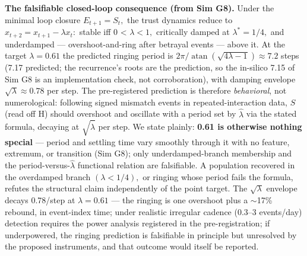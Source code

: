 \documentclass[
]{article}
\begin{document}
\textbf{The falsifiable closed-loop consequence (from Sim G8).} Under
the minimal loop closure \(E_{t+1} = S_t,\) the trust dynamics reduce to
\(x_{t+2} = x_{t+1} - \lambda x_t:\) stable iff 0 \textless{}
\(\lambda < 1,\) critically damped at \(\lambda^{*} = 1/4,\) and
underdamped --- overshoot-and-ring after betrayal events --- above it.
At the target \(\lambda = 0.61\) the predicted ringing period is
\(2\pi/\mathop{\mathrm{atan}}(\sqrt{4\lambda-1}) \approx 7.2\) steps
(7.17 predicted; the recurrence's roots are the prediction, so the
in-silico 7.15 of Sim G8 is an implementation check, not corroboration),
with damping envelope \(\sqrt{\lambda} \approx 0.78\) per step. The
pre-registered prediction is therefore \emph{behavioral}, not
numerological: following signed mismatch events in repeated-interaction
data, \(S\) (read off H) should overshoot and oscillate with a period
set by \(\hat{\lambda}\) via the stated formula, decaying at
\(\sqrt{\hat{\lambda}}\) per step. We state plainly: \textbf{0.61 is
otherwise nothing special} --- period and settling time vary smoothly
through it with no feature, extremum, or transition (Sim G8); only
underdamped-branch membership and the period-versus-\(\hat{\lambda}\)
functional relation are falsifiable. A population recovered in the
overdamped branch \((\lambda < 1/4),\) or ringing whose period fails the
formula, refutes the structural claim independently of the point target.
The \(\sqrt{\lambda}\) envelope decays 0.78/step at \(\lambda = 0.61\)
--- the ringing is one overshoot plus a \(\sim\)17\% rebound, in
event-index time; under realistic irregular cadence (0.3--3 events/day)
detection requires the power analysis registered in the
pre-registration; if underpowered, the ringing prediction is falsifiable
in principle but unresolved by the proposed instruments, and that
outcome would itself be reported.
\end{document}
